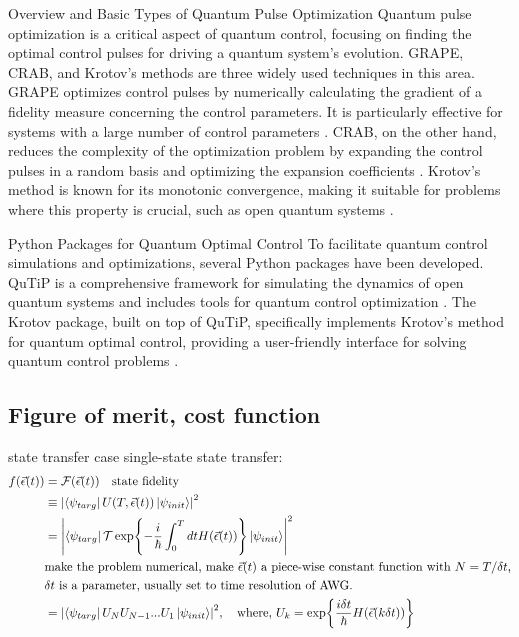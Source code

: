 \documentclass{article}
\begin{document}
Overview and Basic Types of Quantum Pulse Optimization
Quantum pulse optimization is a critical aspect of quantum control, focusing on finding the optimal control pulses for driving a quantum system's evolution. GRAPE, CRAB, and Krotov's methods are three widely used techniques in this area. GRAPE optimizes control pulses by numerically calculating the gradient of a fidelity measure concerning the control parameters. It is particularly effective for systems with a large number of control parameters \cite{khaneja2005}. CRAB, on the other hand, reduces the complexity of the optimization problem by expanding the control pulses in a random basis and optimizing the expansion coefficients \cite{doria2011}. Krotov's method is known for its monotonic convergence, making it suitable for problems where this property is crucial, such as open quantum systems \cite{reich2012}.

Python Packages for Quantum Optimal Control
To facilitate quantum control simulations and optimizations, several Python packages have been developed. QuTiP is a comprehensive framework for simulating the dynamics of open quantum systems and includes tools for quantum control optimization \cite{johansson2013}. The Krotov package, built on top of QuTiP, specifically implements Krotov's method for quantum optimal control, providing a user-friendly interface for solving quantum control problems \cite{goerz2019}.



\subsection{Figure of merit, cost function}
state transfer case
single-state state transfer: 
\begin{align*}
    f(\vec{\epsilon}(t)) &= \mathcal{F}(\vec{\epsilon}(t)) \quad \text{state fidelity}\\
    &\equiv \abs{\bra{\psi_{targ}} U(T,\vec{\epsilon}(t)) \ket{\psi_{init}}}^2 \\
    &= \abs{\bra{\psi_{targ}} 
        \mathcal{T}\exp{-\frac{i}{\hbar}\int_0^T dt H(\vec{\epsilon}(t))}
        \ket{\psi_{init}}}^2 \\
    &\text{make the problem numerical, make $\vec{\epsilon}(t)$ a piece-wise constant function with $N=T/\delta t$,} \\
    &\text{$\delta t$ is a parameter, usually set to time resolution of AWG.} \\
    &= \abs{\bra{\psi_{targ}} 
        U_NU_{N-1}...U_1
        \ket{\psi_{init}}}^2, \quad \text{where, } U_k=\exp{\frac{i\delta t}{\hbar}H(\vec{\epsilon}(k\delta t))} \\
\end{align*}
\end{document}
